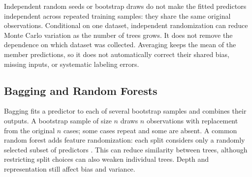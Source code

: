 Independent random seeds or bootstrap draws do not make the fitted predictors independent across repeated training samples: they share the same original observations. Conditional on one dataset, independent randomization can reduce Monte Carlo variation as the number of trees grows. It does not remove the dependence on which dataset was collected. Averaging keeps the mean of the member predictions, so it does not automatically correct their shared bias, missing inputs, or systematic labeling errors.

\par\addvspace{\intextsep}\noindent\begin{minipage}{\linewidth}
\centering
{}
\label{fig:bagging-vs-boosting}
\end{minipage}\par\addvspace{\intextsep}

\subsection{Bagging and Random Forests}

Bagging fits a predictor to each of several bootstrap samples and combines their outputs. A bootstrap sample of size $n$ draws $n$ observations with replacement from the original $n$ cases; some cases repeat and some are absent. A common random forest adds feature randomization: each split considers only a randomly selected subset of predictors \citep{breiman2001forests}. This can reduce similarity between trees, although restricting split choices can also weaken individual trees. Depth and representation still affect bias and variance.

